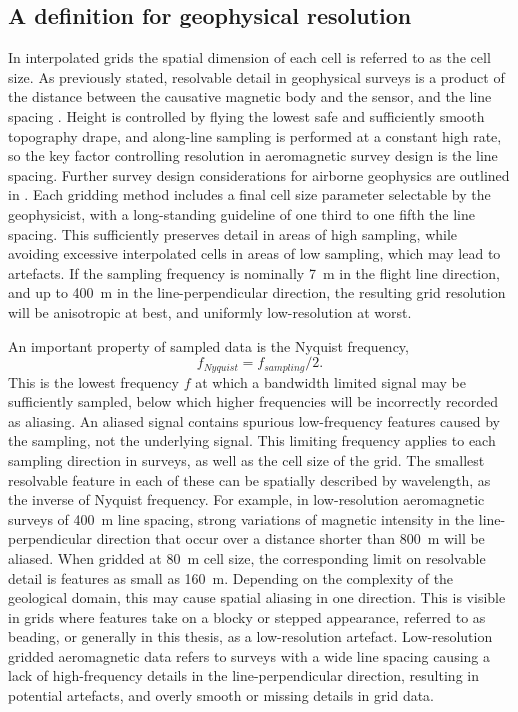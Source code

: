 \subsection{A definition for geophysical resolution}
In interpolated grids the spatial dimension of each cell is referred to as the cell size.
As previously stated, resolvable detail in geophysical surveys is a product of the distance between the causative magnetic body and the sensor, and the line spacing \parencite{islesRelationshipsGeologicalResolution1992,islesGeologicalInterpretationAeromagnetic2013,dentithGeophysicsMineralExploration2014}.
Height is controlled by flying the lowest safe and sufficiently smooth topography drape, and along-line sampling is performed at a constant high rate, so the key factor controlling resolution in aeromagnetic survey design is the line spacing.
Further survey design considerations for airborne geophysics are outlined in \textcite{goodwinAirborneMagneticRadiometric2023,islesGeologicalInterpretationAeromagnetic2013,reidAeromagneticSurveyDesign1980}.
Each gridding method includes a final cell size parameter selectable by the geophysicist, with a long-standing guideline of one third to one fifth the line spacing.
This sufficiently preserves detail in areas of high sampling, while avoiding excessive interpolated cells in areas of low sampling, which may lead to artefacts.
If the sampling frequency is nominally \qty{7}{\m} in the flight line direction, and up to \qty{400}{\m} in the line-perpendicular direction, the resulting grid resolution will be anisotropic at best, and uniformly low-resolution at worst.

An important property of sampled data is the Nyquist frequency, \[f_{Nyquist} = f_{sampling} / 2.\]
This is the lowest frequency \(f\) at which a bandwidth limited signal may be sufficiently sampled, below which higher frequencies will be incorrectly recorded as aliasing.
An aliased signal contains spurious low-frequency features caused by the sampling, not the underlying signal.
This limiting frequency applies to each sampling direction in surveys, as well as the cell size of the grid.
The smallest resolvable feature in each of these can be spatially described by wavelength, as the inverse of Nyquist frequency.
For example, in low-resolution aeromagnetic surveys of \qty{400}{\m} line spacing, strong variations of magnetic intensity in the line-perpendicular direction  that occur over a distance shorter than \qty{800}{\m} will be aliased.
When gridded at \qty{80}{\m} cell size, the corresponding limit on resolvable detail is features as small as \qty{160}{\m}.
Depending on the complexity of the geological domain, this may cause spatial aliasing in one direction.
This is visible in grids where features take on a blocky or stepped appearance, referred to as  beading, or generally in this thesis, as a low-resolution artefact.
Low-resolution gridded aeromagnetic data refers to surveys with a wide line spacing causing a lack of high-frequency details in the line-perpendicular direction, resulting in potential artefacts, and overly smooth or missing details in grid data.

